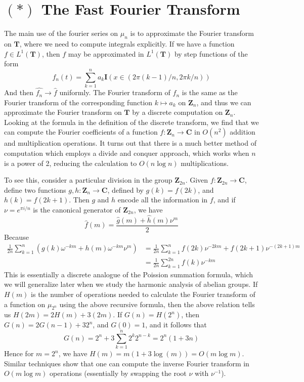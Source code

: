 \section{$(*)$ The Fast Fourier Transform}

The main use of the fourier series on $\mu_n$ is to approximate the Fourier transform on $\mathbf{T}$, where we need to compute integrals explicitly. If we have a function $f \in L^1(\mathbf{T})$, then $f$ may be approximated in $L^1(\mathbf{T})$ by step functions of the form
%
\[ f_n(t) = \sum_{k = 1}^{n} a_k \mathbf{I}(x \in (2 \pi (k-1) / n, 2 \pi k / n)) \]
%
And then $\widehat{f_n} \to \widehat{f}$ uniformly. The Fourier transform of $f_n$ is the same as the Fourier transform of the corresponding function $k \mapsto a_k$ on $\mathbf{Z}_n$, and thus we can approximate the Fourier transform on $\mathbf{T}$ by a discrete computation on $\mathbf{Z}_n$. Looking at the formula in the definition of the discrete transform, we find that we can compute the Fourier coefficients of a function $f: \mathbf{Z}_n \to \mathbf{C}$ in $O(n^2)$ addition and multiplication operations. It turns out that there is a much better method of computation which employs a divide and conquer approach, which works when $n$ is a power of 2, reducing the calculation to $O(n \log n)$ multiplications.

To see this, consider a particular division in the group $\mathbf{Z}_{2n}$. Given $f: \mathbf{Z}_{2n} \to \mathbf{C}$, define two functions $g,h: \mathbf{Z}_n \to \mathbf{C}$, defined by $g(k) = f(2k)$, and $h(k) = f(2k + 1)$. Then $g$ and $h$ encode all the information in $f$, and if $\nu = e^{\pi i/n}$ is the canonical generator of $\mathbf{Z}_{2n}$, we have
%
\[ \hat{f}(m) = \frac{\hat{g}(m) + \hat{h}(m) \nu^m}{2} \]
%
Because
%
\begin{align*}
    \frac{1}{2n} \sum_{k = 1}^{n} \left( g(k) \omega^{-km} + h(m) \omega^{-km} \nu^m \right) &= \frac{1}{2n} \sum_{k = 1}^n f(2k) \nu^{-2km} + f(2k + 1) \nu^{-(2k+1)m}\\
    &= \frac{1}{2n} \sum_{k = 1}^{2n} f(k) \nu^{-km}
\end{align*}
%
This is essentially a discrete analogue of the Poission summation formula, which we will generalize later when we study the harmonic analysis of abelian groups. If $H(m)$ is the number of operations needed to calculate the Fourier transform of a function on $\mu_{2^n}$ using the above recursive formula, then the above relation tells us $H(2m) = 2H(m) + 3 (2m)$. If $G(n) = H(2^n)$, then $G(n) = 2G(n-1) + 3 2^n$, and $G(0) = 1$, and it follows that
%
\[ G(n) = 2^n + 3 \sum_{k = 1}^n 2^{k} 2^{n-k} = 2^n(1 + 3n) \]
%
Hence for $m = 2^n$, we have $H(m) = m(1 + 3 \log (m)) = O(m \log m)$. Similar techniques show that one can compute the inverse Fourier transform in $O(m \log m)$ operations (essentially by swapping the root $\nu$ with $\nu^{-1}$).

